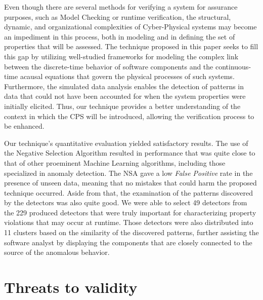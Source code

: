 Even though there are several methods for verifying a system for assurance purposes, such as Model Checking or runtime verification, the structural, dynamic, and organizational complexities of Cyber-Physical systems may become an impediment in this process, both in modeling and in defining the set of properties that will be assessed. The technique proposed in this paper seeks to fill this gap by utilizing well-studied frameworks for modeling the complex link between the discrete-time behavior of software components and the continuous-time acausal equations that govern the physical processes of such systems. Furthermore, the simulated data analysis enables the detection of patterns in data that could not have been accounted for when the system properties were initially elicited. Thus, our technique provides a better understanding of the context in which the CPS will be introduced, allowing the verification process to be enhanced.

Our technique's quantitative evaluation yielded satisfactory results. The use of the Negative Selection Algorithm resulted in performance that was quite close to that of other proeminent Machine Learning algorithms, including those specialized in anomaly detection. The NSA gave a low \textit{False Positive} rate in the presence of unseen data, meaning that no mistakes that could harm the proposed technique occurred. Aside from that, the examination of the patterns discovered by the detectors was also quite good. We were able to select 49 detectors from the 229 produced detectors that were truly important for characterizing property violations that may occur at runtime. Those detectors were also distributed into 11 clusters based on the similarity of the discovered patterns, further assisting the software analyst by displaying the components that are closely connected to the source of the anomalous behavior.


\section{Threats to validity}

